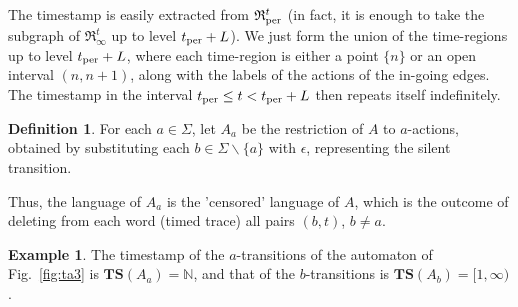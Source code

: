 \documentclass[11pt]{amsart}
\theoremstyle{definition}
\newtheorem{definition}[theorem]{Definition}
\newtheorem{example}[theorem]{Example}
\newcommand{\IARRR}{\mathfrak{R}_{\infty}^{t}}
\newcommand{\PARRR}{\mathfrak{R}_\textnormal{per}^{t}}
\newcommand{\TTTSSS}{\mathbf{TS}}
\newcommand{\Actions}{\Sigma}
\newcommand{\Naturals}{\mathbb{N}}
\begin{document}
The timestamp is easily extracted from $\PARRR$ (in fact, it is enough to take the subgraph of $\IARRR$ up to level $t_\textnormal{per}+ L$).
We just form the union of the time-regions up to level $t_\textnormal{per}+ L$, where each time-region is either a point $\{n\}$ or an open interval $(n,n+1)$, along with the labels of the actions of the in-going edges.
The timestamp in the interval $t_\textnormal{per} \leq t < t_\textnormal{per}+ L$ then repeats itself indefinitely. 
\begin{definition}
	For each $a \in \Actions$, let $A_a$ be the restriction of $A$ to $a$-actions, obtained by substituting each $b \in \Actions \smallsetminus \{a\}$ with $\epsilon$, representing the silent transition.
\end{definition}
Thus, the language of $A_a$ is the 'censored' language of $A$, which is the outcome of deleting from each word (timed trace) all pairs $(b,t)$, $b \neq a$.
\begin{example}
	The timestamp of the $a$-transitions of the automaton of Fig.~\ref{fig:ta3} is $\TTTSSS(A_a) = \Naturals$, and that of the $b$-transitions is $\TTTSSS(A_b) = [1,\infty)$.
\end{example}
\end{document}
